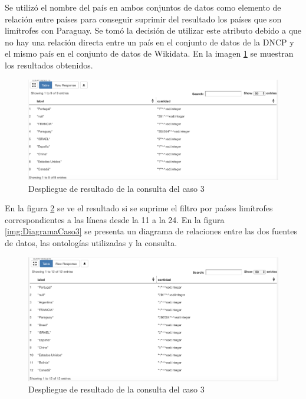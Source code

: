 Se utilizó el nombre del país en ambos conjuntos de datos como elemento de relación entre países para conseguir suprimir del resultado los países que son limítrofes con Paraguay. Se tomó la decisión de utilizar este atributo debido a que no hay una relación directa entre un país en el conjunto de datos de la DNCP y el mismo país en el conjunto de datos de Wikidata. En la imagen \ref{img:caso3Resultado1} se muestran los resultados obtenidos.


\begin{figure}[ht!]
    \centering
    \includegraphics[width=150mm]{figuras/caso3Resultado1.png}
    \caption{Despliegue de resultado de la consulta del caso 3}
    \label{img:caso3Resultado1}
 \end{figure}


En la figura \ref{img:caso3Resultado2} se ve el resultado si se suprime el filtro por países limítrofes correspondientes a las líneas desde la 11 a la 24. En la figura \ref{img:DiagramaCaso3} se presenta un diagrama de relaciones entre las dos fuentes de datos, las ontologías utilizadas y la consulta.


 \begin{figure}[ht!]
    \centering
    \includegraphics[width=150mm]{figuras/caso3Resultado2.png}
    \caption{Despliegue de resultado de la consulta del caso 3}
    \label{img:caso3Resultado2}
 \end{figure}


